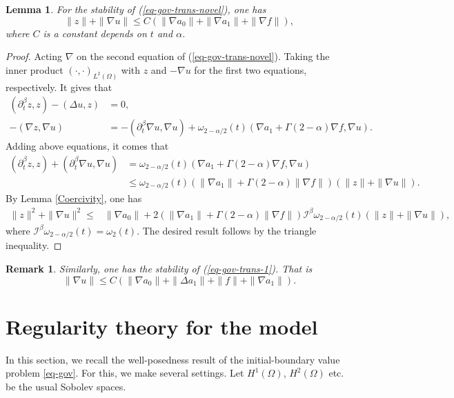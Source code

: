 \documentclass[11pt]{article}
\newtheorem{lemma}{Lemma}[section]
\newtheorem{remark}{Remark}[section]
\numberwithin{equation}{section}
\begin{document}
\begin{lemma}
For the stability of (\ref{eq-gov-trans-novel}), one has    
$$\|z\| + \|\nabla u\|\leq C(\|\nabla a_0\|+\|\nabla a_1\|+\|\nabla f\|),$$
where $C$ is a constant depends on $t$ and $\alpha$.
\end{lemma}
\begin{proof}
Acting $\nabla$ on the second equation of (\ref{eq-gov-trans-novel}). Taking the inner product $(\cdot,\cdot)_{L^2(\Omega)}$ with $z$ and $-\nabla u$ for the first two equations, respectively. It gives that
\begin{align*}
(\partial_t^\beta z,z) - (\Delta u,z) &= 0, \\
-(\nabla z,\nabla u)  &= -(\partial_t^\beta \nabla u,\nabla u)+\omega_{2-\alpha/2}(t)(\nabla a_1+\Gamma{(2-\alpha)}\nabla f,\nabla u). 
\end{align*}
Adding above equations, it comes that
\begin{align*}
(\partial_t^\beta z,z) + (\partial_t^\beta \nabla u,\nabla u)
&= \omega_{2-\alpha/2}(t)(\nabla a_1+\Gamma{(2-\alpha)}\nabla f,\nabla u)\\
&\le \omega_{2-\alpha/2}(t)(\|\nabla a_1\|+\Gamma{(2-\alpha)}\|\nabla f\|)(\|z\|+\|\nabla u\|).
\end{align*}
By Lemma \ref{Coercivity}, one has
\begin{align*}
\|z\|^2 + \|\nabla u\|^2
\le& \|\nabla a_0\|+2(\|\nabla a_1\|+\Gamma{(2-\alpha)}\|\nabla f\|)\mathcal{I}^{\beta}\omega_{2-\alpha/2}(t)(\|z\|+\|\nabla u\|),
\end{align*}
where $\mathcal{I}^{\beta}\omega_{2-\alpha/2}(t)=\omega_{2}(t)$.
The desired result follows by the triangle inequality.
\end{proof}

\begin{remark}
Similarly, one has the stability of (\ref{eq-gov-trans-1}). That is  $$\|\nabla u\|\le C(\|\nabla a_0\|+\|\Delta a_1\|+\|f\|+\|\nabla a_1\|).$$
\end{remark}


\section{Regularity theory for the model}\label{sec-reg}
In this section, we recall the well-posedness result of the initial-boundary value problem \eqref{eq-gov}. For this, we make several settings. Let $H^1(\Omega)$, $H^2(\Omega)$ etc. be the usual Sobolev spaces.
\end{document}
